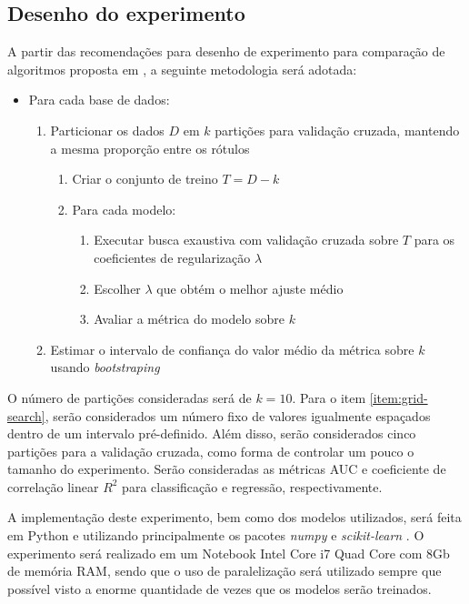 \documentclass[conference]{IEEEtran}
\begin{document}
	\subsection{Desenho do experimento}
	A partir das recomendações para desenho de experimento para comparação de algoritmos proposta em \cite{salzberg1997comparing}, a seguinte metodologia será adotada:
	\begin{itemize}
		\item Para cada base de dados:
			\begin{enumerate}
			\item Particionar os dados $D$ em $k$ partições para validação cruzada, mantendo a mesma proporção entre os rótulos
			\begin{enumerate}
				\item Criar o conjunto de treino $T = D - k$
				\item Para cada modelo:
				\begin{enumerate}
					\item Executar busca exaustiva com validação cruzada sobre $T$ para os coeficientes de regularização $\lambda$ \label{item:grid-search}
					\item Escolher $\lambda$ que obtém o melhor ajuste médio 
					\item Avaliar a métrica do modelo sobre $k$
				\end{enumerate}
			\end{enumerate}
			\item Estimar o intervalo de confiança do valor médio da métrica sobre $k$ usando \textit{bootstraping}
		\end{enumerate}
	\end{itemize}
	
	O número de partições consideradas será de $k=10$. Para o item \ref{item:grid-search}, serão considerados um número fixo de valores igualmente espaçados  dentro de um intervalo pré-definido. Além disso, serão considerados cinco partições para a validação cruzada, como forma de controlar um pouco o tamanho do experimento. Serão consideradas as métricas AUC e coeficiente de correlação linear $R^2$ para classificação e regressão, respectivamente.
	
	A implementação deste experimento, bem como dos modelos utilizados, será feita em Python e utilizando principalmente os pacotes \textit{numpy} \cite{harris2020array} e \textit{scikit-learn} \cite{scikit-learn}. O experimento será realizado em um Notebook Intel Core i7 Quad Core com 8Gb de memória RAM, sendo que o uso de paralelização será utilizado sempre que possível visto a enorme quantidade de vezes que os modelos serão treinados.
	
\end{document}
